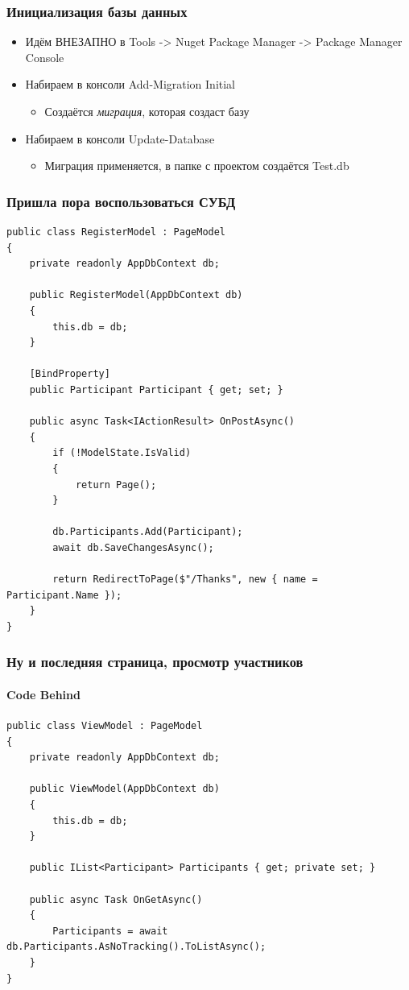 \documentclass[xetex,mathserif,serif]{beamer}
\begin{document}
	\begin{frame}
		\frametitle{Инициализация базы данных}
		\begin{itemize}
			\item Идём ВНЕЗАПНО в Tools -> Nuget Package Manager -> Package Manager Console
			\item Набираем в консоли Add-Migration Initial
			\begin{itemize}
				\item Создаётся \textit{миграция}, которая создаст базу
			\end{itemize}
			\item Набираем в консоли Update-Database
			\begin{itemize}
				\item Миграция применяется, в папке с проектом создаётся Test.db
			\end{itemize}
		\end{itemize}
	\end{frame}

	\begin{frame}[fragile]
		\frametitle{Пришла пора воспользоваться СУБД}
		\begin{ssmall}
			\begin{verbatim}
public class RegisterModel : PageModel
{
    private readonly AppDbContext db;

    public RegisterModel(AppDbContext db)
    {
        this.db = db;
    }

    [BindProperty]
    public Participant Participant { get; set; }

    public async Task<IActionResult> OnPostAsync()
    {
        if (!ModelState.IsValid)
        {
            return Page();
        }

        db.Participants.Add(Participant);
        await db.SaveChangesAsync();

        return RedirectToPage($"/Thanks", new { name = Participant.Name });
    }
}
			\end{verbatim}
		\end{ssmall}
	\end{frame}

	\begin{frame}[fragile]
		\frametitle{Ну и последняя страница, просмотр участников}
		\framesubtitle{Code Behind}
		\begin{scriptsize}
			\begin{verbatim}
public class ViewModel : PageModel
{
    private readonly AppDbContext db;

    public ViewModel(AppDbContext db)
    {
        this.db = db;
    }

    public IList<Participant> Participants { get; private set; }

    public async Task OnGetAsync()
    {
        Participants = await db.Participants.AsNoTracking().ToListAsync();
    }
}
			\end{verbatim}
		\end{scriptsize}
	\end{frame}
\end{document}
